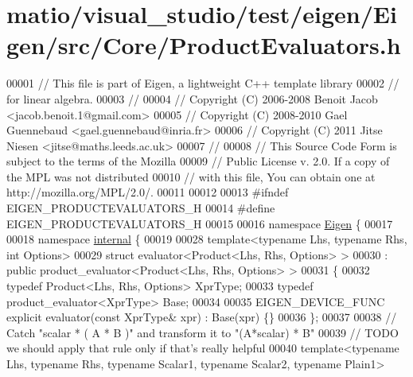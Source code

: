 \hypertarget{matio_2visual__studio_2test_2eigen_2_eigen_2src_2_core_2_product_evaluators_8h_source}{}\section{matio/visual\+\_\+studio/test/eigen/\+Eigen/src/\+Core/\+Product\+Evaluators.h}
\label{matio_2visual__studio_2test_2eigen_2_eigen_2src_2_core_2_product_evaluators_8h_source}

\begin{DoxyCode}
00001 \textcolor{comment}{// This file is part of Eigen, a lightweight C++ template library}
00002 \textcolor{comment}{// for linear algebra.}
00003 \textcolor{comment}{//}
00004 \textcolor{comment}{// Copyright (C) 2006-2008 Benoit Jacob <jacob.benoit.1@gmail.com>}
00005 \textcolor{comment}{// Copyright (C) 2008-2010 Gael Guennebaud <gael.guennebaud@inria.fr>}
00006 \textcolor{comment}{// Copyright (C) 2011 Jitse Niesen <jitse@maths.leeds.ac.uk>}
00007 \textcolor{comment}{//}
00008 \textcolor{comment}{// This Source Code Form is subject to the terms of the Mozilla}
00009 \textcolor{comment}{// Public License v. 2.0. If a copy of the MPL was not distributed}
00010 \textcolor{comment}{// with this file, You can obtain one at http://mozilla.org/MPL/2.0/.}
00011 
00012 
00013 \textcolor{preprocessor}{#ifndef EIGEN\_PRODUCTEVALUATORS\_H}
00014 \textcolor{preprocessor}{#define EIGEN\_PRODUCTEVALUATORS\_H}
00015 
00016 \textcolor{keyword}{namespace }\hyperlink{namespace_eigen}{Eigen} \{
00017   
00018 \textcolor{keyword}{namespace }\hyperlink{namespaceinternal}{internal} \{
00019 
00028 \textcolor{keyword}{template}<\textcolor{keyword}{typename} Lhs, \textcolor{keyword}{typename} Rhs, \textcolor{keywordtype}{int} Options>
00029 \textcolor{keyword}{struct }evaluator<Product<Lhs, Rhs, Options> > 
00030  : \textcolor{keyword}{public} product\_evaluator<Product<Lhs, Rhs, Options> >
00031 \{
00032   \textcolor{keyword}{typedef} Product<Lhs, Rhs, Options> XprType;
00033   \textcolor{keyword}{typedef} product\_evaluator<XprType> Base;
00034   
00035   EIGEN\_DEVICE\_FUNC \textcolor{keyword}{explicit} evaluator(\textcolor{keyword}{const} XprType& xpr) : Base(xpr) \{\}
00036 \};
00037  
00038 \textcolor{comment}{// Catch "scalar * ( A * B )" and transform it to "(A*scalar) * B"}
00039 \textcolor{comment}{// TODO we should apply that rule only if that's really helpful}
00040 \textcolor{keyword}{template}<\textcolor{keyword}{typename} Lhs, \textcolor{keyword}{typename} Rhs, \textcolor{keyword}{typename} Scalar1, \textcolor{keyword}{typename} Scalar2, \textcolor{keyword}{typename} Plain1>

\end{DoxyCode}
